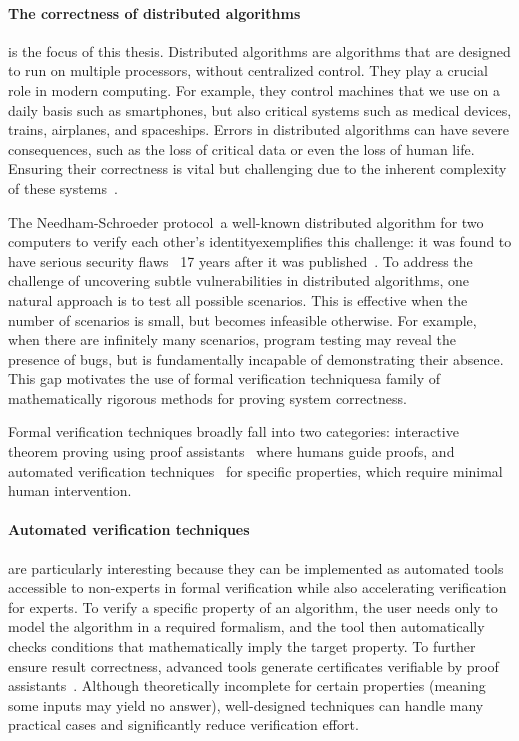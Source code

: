 
\paragraph{The correctness of distributed algorithms} is the focus of this thesis. Distributed algorithms
are algorithms that are designed to run on multiple processors, without centralized control. They play a crucial role in modern computing.
For example, they control machines that we use on a daily basis such as smartphones, but also critical systems such as medical devices, trains, airplanes, and spaceships. Errors in distributed algorithms can have severe consequences, such as the loss of critical data or even the loss of human life. Ensuring their correctness is vital but challenging due to the inherent complexity of these systems~\cite{heiser2010theroad, lamport2019thebyzantine}. 

The Needham-Schroeder protocol~\cite{needham1978using}\textemdash a well-known distributed algorithm for two computers to verify each other's identity\textemdash exemplifies this challenge: it was found to have serious security flaws~\cite{lowe1996breaking} 17 years after it was published~\cite{cortier2014formal}.
To address the challenge of uncovering subtle vulnerabilities in distributed algorithms, one natural approach is to test all possible scenarios. This is effective when the number of scenarios is small, but becomes infeasible otherwise. For example, when there are infinitely many scenarios, program testing may reveal the presence of bugs, but is fundamentally incapable of demonstrating their absence.
This gap motivates the use of formal verification techniques\textemdash a family of mathematically rigorous methods for proving system correctness.

Formal verification techniques broadly fall into two categories: interactive theorem proving using proof assistants~\cite{moura2021lean4, bertot2004coq,nipkow2002isabelle} where humans guide proofs, and automated verification techniques~\cite{clarke2018model, contejean2011automated} for specific properties, which require minimal human intervention.

\paragraph{Automated verification techniques} are particularly interesting because they can be implemented as automated tools accessible to non-experts in formal verification while also accelerating verification for experts.
To verify a specific property of an algorithm, the user needs only to model the algorithm in a required formalism, and the tool then automatically checks conditions that mathematically imply the target property. To further ensure result correctness, advanced tools generate certificates verifiable by proof assistants~\cite{contejean2011automated}. 
Although theoretically incomplete for certain properties (meaning some inputs may yield no answer), well-designed techniques can handle many practical cases and significantly reduce verification effort.

